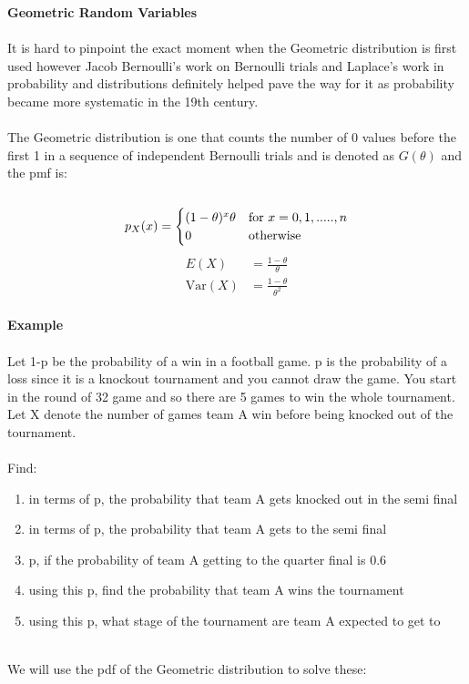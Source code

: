 \documentclass[,oneside]{article}
\begin{document}
\begin{enumerate}
\begin{enumerate}
\end{enumerate}
\textbf{Geometric Random Variables}\\ \\
It is hard to pinpoint the exact moment when the Geometric distribution is first used however Jacob Bernoulli's work on Bernoulli trials and Laplace's work in probability and distributions definitely helped pave the way for it as probability became more systematic in the 19th century. \\ \\
The Geometric distribution is one that counts the number of 0 values before the first 1 in a sequence of independent Bernoulli trials and is denoted as $G(\theta)$ and the pmf is:\\ \\
\[
p_X(x)=
\begin{cases}
(1-\theta)^x \theta & \text{for }  x = 0, 1,....., n \\
0 & $otherwise$
\end{cases} \] 
\begin{align*}
E(X)&=\frac{1-\theta}{\theta}\\
\text{Var}(X)&=\frac{1-\theta}{\theta^2}
\end{align*}\\
\textbf{Example}\\ \\
Let 1-p be the probability of a win in a football game. p is the probability of a loss since it is a knockout tournament and you cannot draw the game. You start in the round of 32 game and so there are 5 games to win the whole tournament. Let X denote the number of games team A win before being knocked out of the tournament. \\ \\
Find:
\begin{enumerate}
\item in terms of p, the probability that team A gets knocked out in the semi final
\item in terms of p, the probability that team A gets to the semi final 
\item p, if the probability of team A getting to the quarter final is 0.6
\item using this p, find the probability that team A wins the tournament
\item using this p, what stage of the tournament are team A expected to get to\\
\end{enumerate}
\\ We will use the pdf of the Geometric distribution to solve these:\\

\end{enumerate}
\end{document}
